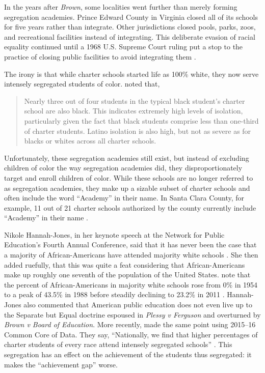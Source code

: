 In the years after \textit{Brown}, some localities went further than merely forming segregation academies. Prince Edward County in Virginia closed all of its schools for five years rather than integrate. Other jurisdictions closed pools, parks, zoos, and recreational facilities instead of integrating. This deliberate evasion of racial equality continued until a 1968 U.S. Supreme Court ruling put a stop to the practice of closing public facilities to avoid integrating them \parencite{Brennan1968}.

The irony is that while charter schools started life as 100\% white, they now serve intensely segregated students of color. \textcite[47]{Frankenberg.etal2019} noted that,

\begin{quotation}\noindent
Nearly three out of four students in the typical black student's charter school are also black. This indicates extremely high levels of isolation, particularly given the fact that black students comprise less than one-third of charter students. Latino isolation is also high, but not as severe as for blacks or whites across all charter schools.
\end{quotation}

Unfortunately, these segregation academies still exist, but instead of excluding children of color the way segregation academies did, they disproportionately target and enroll children of color. While these schools are no longer referred to as segregation academies, they make up a sizable subset of charter schools and often include the word ``Academy'' in their name. In Santa Clara County, for example, 11 out of 21 charter schools authorized by the county currently include ``Academy'' in their name \parencite{SCCOE2023}.

Nikole Hannah-Jones, in her keynote speech at the Network for Public Education's Fourth Annual Conference, said that it has never been the case that a majority of African-Americans have attended majority white schools \parencite{Hannah-Jones2017}. She then added ruefully, that this was quite a feat considering that African-Americans make up roughly one seventh of the population of the United States. \citeauthor{Orfield.Frankenberg2014} note that the percent of African-Americans in majority white schools rose from 0\% in 1954 to a peak of 43.5\% in 1988 before steadily declining to 23.2\% in 2011 \parencite[Table 3: Percent of Black Students in Majority White Schools, 1954–2011,][10]{Orfield.Frankenberg2014}. Hannah-Jones also commented that American public education does not even live up to the Separate but Equal doctrine espoused in \textit{Plessy v Ferguson} and overturned by \textit{Brown v Board of Education}. More recently, \citeauthor{Heilig.etal2019a} made the same point using 2015--16 Common Core of Data. They say, ``Nationally, we find that higher percentages of charter students of every race attend intensely segregated schools'' \parencite[205]{Heilig.etal2019a}. This segregation has an effect on the achievement of the students thus segregated: it makes the ``achievement gap'' worse. %

